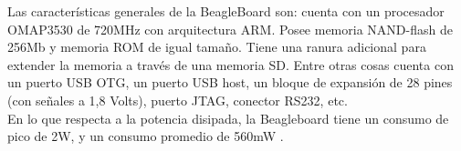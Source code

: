 Las características generales de la BeagleBoard son: cuenta con un procesador \\
OMAP3530 de 720MHz con arquitectura ARM. Posee  memoria NAND-flash de 256Mb y memoria ROM de igual tamaño. Tiene una ranura adicional para extender la memoria a través de una memoria SD. Entre otras cosas cuenta con un puerto USB OTG, un puerto USB host, un bloque de expansión de 28 pines (con señales a 1,8 Volts), puerto JTAG, conector RS232, etc.\\
En lo que respecta a la potencia disipada, la Beagleboard tiene un consumo de pico de 2W, y un consumo promedio de 560mW \cite{consumo1} \cite{consumo2}.

\begin{figure}[H]
  \centering
\end{figure}
